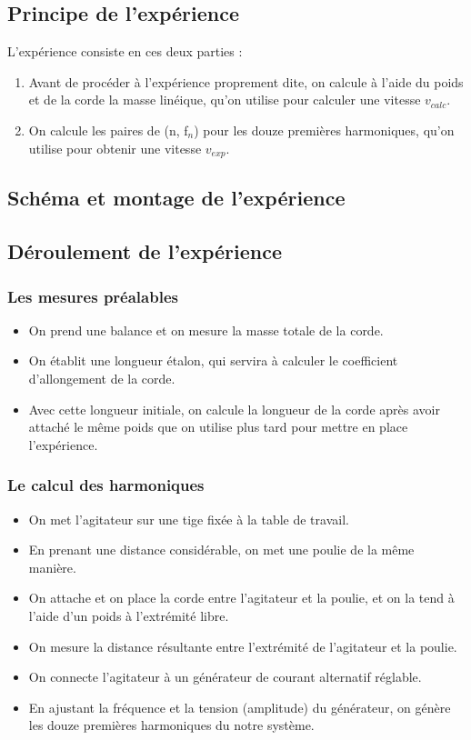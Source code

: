 \documentclass[12pt,a4paper]{article}
\begin{document}
    \subsection{Principe de l'expérience}
    L'expérience consiste en ces deux parties :
    \begin{enumerate}
        \item Avant de procéder à l'expérience proprement dite, on calcule à l'aide du poids et de la corde la masse linéique, qu'on utilise pour calculer une vitesse $v_{calc}$.
        \item On calcule les paires de (n, f$_n$) pour les douze premières harmoniques, qu'on utilise pour obtenir une vitesse $v_{exp}$.
    \end{enumerate}

    \subsection{Schéma et montage de l’expérience}
    \subsection{Déroulement de l'expérience}
    \subsubsection{Les mesures préalables}
    \begin{itemize}
        \item On prend une balance et on mesure la masse totale de la corde.
        \item On établit une longueur étalon, qui servira à calculer le coefficient d'allongement de la corde.
        \item Avec cette longueur initiale, on calcule la longueur de la corde après avoir attaché le même poids que on utilise plus tard pour mettre en place l'expérience.
    \end{itemize}
    \subsubsection{Le calcul des harmoniques}
    \begin{itemize}
        \item On met l'agitateur sur une tige fixée à la table de travail.
        \item En prenant une distance considérable, on met une poulie de la même manière.
        \item On attache et on place la corde entre l'agitateur et la poulie, et on la tend à l'aide d'un poids à l'extrémité libre.
        \item On mesure la distance résultante entre l'extrémité de l'agitateur et la poulie.
        \item On connecte l'agitateur à un générateur de courant alternatif réglable.
        \item En ajustant la fréquence et la tension (amplitude) du générateur, on génère les douze premières harmoniques du notre système.
    \end{itemize}
\end{document}
